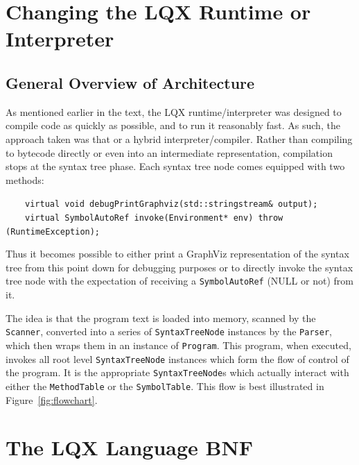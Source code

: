 \documentclass[]{article}
\begin{document}
  
  \section{Changing the LQX Runtime or Interpreter}
  \subsection{General Overview of Architecture}
  
  As mentioned earlier in the text, the LQX runtime/interpreter was designed to compile code
  as quickly as possible, and to run it reasonably fast. As such, the approach taken was that
  or a hybrid interpreter/compiler. Rather than compiling to bytecode directly or even into
  an intermediate representation, compilation stops at the syntax tree phase. Each syntax tree
  node comes equipped with two methods:
  
  \ \ \ \ {\tt virtual void debugPrintGraphviz(std::stringstream\& output); }\\
  \null\ \ \ \ {\tt virtual SymbolAutoRef invoke(Environment* env) throw (RuntimeException);}
  
  Thus it becomes possible to either print a GraphViz representation of the syntax tree from
  this point down for debugging purposes or to directly invoke the syntax tree node with the
  expectation of receiving a {\tt SymbolAutoRef} (NULL or not) from it. 
  
  The idea is that the program text is loaded into memory, scanned by the {\tt Scanner}, 
  converted into a series of {\tt SyntaxTreeNode} instances by the {\tt Parser}, which
  then wraps them in an instance of {\tt Program}. This program, when executed, invokes
  all root level {\tt SyntaxTreeNode} instances which form the flow of control of the program.
  It is the appropriate {\tt SyntaxTreeNode}s which actually interact with either the
  {\tt MethodTable} or the {\tt SymbolTable}. This flow is best illustrated in 
  Figure~\ref{fig:flowchart}.
  
  \newpage
  
  \section{The LQX Language BNF}
  
\end{document}
